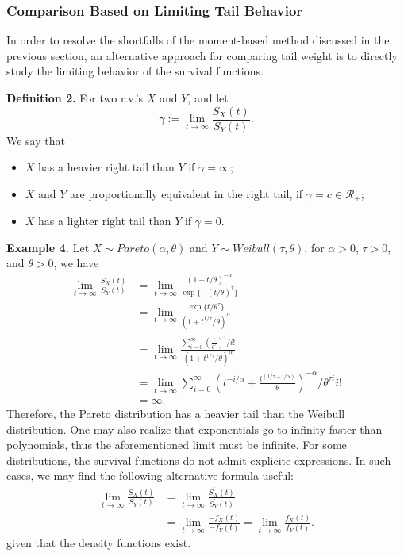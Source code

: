 \documentclass[]{book}
\providecommand{\tightlist}{%
  \setlength{\itemsep}{0pt}\setlength{\parskip}{0pt}}
\theoremstyle{definition}
\theoremstyle{definition}
\theoremstyle{definition}
\theoremstyle{remark}
\begin{document}
\subsubsection{Comparison Based on Limiting Tail
Behavior}\label{comparison-based-on-limiting-tail-behavior}

In order to resolve the shortfalls of the moment-based method discussed
in the previous section, an alternative approach for comparing tail
weight is to directly study the limiting behavior of the survival
functions.

\textbf{Definition 2.} For two r.v.'s \(X\) and \(Y\), and let \[
\gamma:=\lim_{t\rightarrow \infty}\frac{S_X(t)}{S_Y(t)}.
\] We say that

\begin{itemize}
\tightlist
\item
  \(X\) has a heavier right tail than \(Y\) if \(\gamma=\infty\);
\item
  \(X\) and \(Y\) are proportionally equivalent in the right tail, if
  \(\gamma =c\in \mathcal{R}_+\);
\item
  \(X\) has a lighter right tail than \(Y\) if \(\gamma=0\).
\end{itemize}

\textbf{Example 4.} Let \(X\sim Pareto(\alpha, \theta)\) and
\(Y\sim Weibull(\tau, \theta)\), for \(\alpha>0\), \(\tau>0\), and
\(\theta>0\), we have \[\begin{aligned}
    \lim_{t\rightarrow \infty}\frac{S_X(t)}{S_Y(t)} &= \lim_{t\rightarrow \infty}\frac{(1+t/\theta)^{-\alpha}}{\exp\{-(t/\theta)^{\tau}\}} \\
    &= \lim_{t\rightarrow \infty}\frac{\exp\{t/\theta^{\tau} \}}{(1+t^{1/\tau}/\theta)^{\alpha}} \\
    &= \lim_{t\rightarrow \infty}\frac{\sum_{i=0}^{\infty}\left(\frac{t}{\theta^{\tau}}\right)^{i}/i!}{(1+t^{1/\tau}/\theta)^{\alpha}}\\
    &= \lim_{t\rightarrow \infty} \sum_{i=0}^{\infty} \left(t^{-i/\alpha}+\frac{t^{(1/\tau-i/\alpha)}}{\theta} \right)^{-\alpha}/\theta^{\tau i}i!\\
    &= \infty.
    \end{aligned}\] Therefore, the Pareto distribution has a heavier
tail than the Weibull distribution. One may also realize that
exponentials go to infinity faster than polynomials, thus the
aforementioned limit must be infinite. For some distributions, the
survival functions do not admit explicite expressions. In such cases, we
may find the following alternative formula useful: \[\begin{aligned}
    \lim_{t\to \infty} \frac{S_X(t)}{S_Y(t)} &= \lim_{t \to \infty} \frac{S_X^{'}(t)}{S_Y^{'}(t)} \\
    &= \lim_{t \to \infty} \frac{-f_X(t)}{-f_Y(t)} = \lim_{t\to \infty} \frac{f_X(t)}{f_Y(t)}.\end{aligned}\]
given that the density functions exist.
\end{document}
